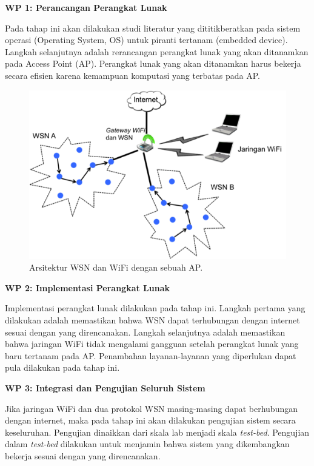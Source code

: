 	\noindent\textbf{WP 1: Perancangan Perangkat Lunak}

	Pada tahap ini akan dilakukan studi literatur yang dititikberatkan pada sistem operasi (Operating System, OS) untuk piranti tertanam (embedded device). Langkah selanjutnya adalah rerancangan perangkat lunak yang akan ditanamkan pada Access Point (AP). Perangkat lunak yang akan ditanamkan harus bekerja secara efisien karena kemampuan komputasi yang terbatas pada AP.

		\begin{figure}[ht!]
		  \centering
		    \includegraphics{gambar/wifi}
		    \caption{Arsitektur WSN dan WiFi dengan sebuah AP.}
		    \label{wifi}
		\end{figure}

	\noindent\textbf{WP 2: Implementasi Perangkat Lunak}

	Implementasi perangkat lunak dilakukan pada tahap ini. Langkah pertama yang dilakukan adalah memastikan bahwa WSN dapat terhubungan dengan internet sesuai dengan yang direncanakan. Langkah selanjutnya adalah memastikan bahwa jaringan WiFi tidak mengalami gangguan setelah perangkat lunak yang baru tertanam pada AP. Penambahan layanan-layanan yang diperlukan dapat pula dilakukan pada tahap ini.

	\noindent\textbf{WP 3: Integrasi dan Pengujian Seluruh Sistem}

	Jika jaringan WiFi dan dua protokol WSN masing-masing dapat berhubungan dengan internet, maka pada tahap ini akan dilakukan pengujian sistem secara keseluruhan. Pengujian dinaikkan dari skala lab menjadi skala \emph{test-bed}. Pengujian dalam \emph{test-bed} dilakukan untuk menjamin bahwa sistem yang dikembangkan bekerja sesuai dengan yang direncanakan.


